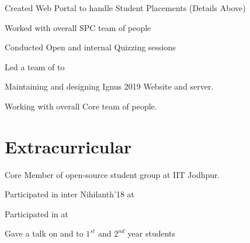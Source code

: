 \documentclass[]{deedy-resume-openfont}
\begin{document}
\begin{minipage}[t]{0.67\textwidth}
\begin{tightemize}
\item Created Web Portal to handle Student Placements  \small{(Details Above)}
\item Worked with overall SPC team of  people
\end{tightemize}

\begin{tightemize}
\item Conducted Open and internal Quizzing sessions
\item Led a team of  to 
\end{tightemize}

\begin{tightemize}
\item Maintaining and designing Ignus 2019 Website  and server.
\item Working with overall Core team of  people.
\end{tightemize}


\section{Extracurricular} 
\begin{bulletedlist}
\item Core Member of open-source student group  at IIT Jodhpur.
\item Participated in inter  Nihilanth'18 at 
\item Participated in  at 
\item Gave a talk on  and  to $1^{st}$  and $2^{nd}$ year students

\end{bulletedlist}
\end{minipage} 
\end{document}
